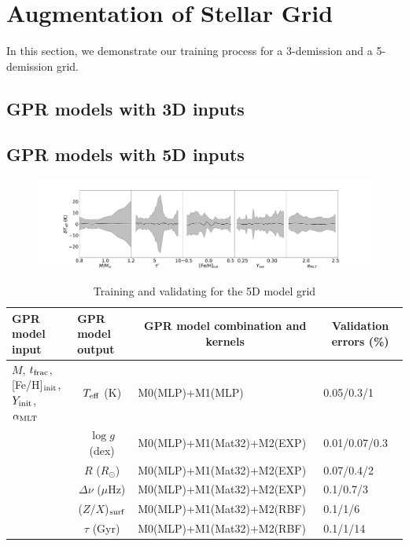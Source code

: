 \section{Augmentation of Stellar Grid}\label{sec:augmentation}
In this section, we demonstrate our training process for a 3-demission and a 5-demission grid.  

\subsection{GPR models with 3D inputs}

\subsection{GPR models with 5D inputs}

\begin{figure}
	\includegraphics[width=1.1\textwidth]{validataion_vs_inputs_teff.pdf}
    \caption{}
    \label{fig:5dresults}
\end{figure}


\begin{table}
	\centering
	\caption{Training and validating for the 5D model grid}
	\label{tab:gpdetails}
	\begin{tabular}{lcll} %
		\hline
		 GPR model input &\multicolumn{1}{l}{GPR model output} & \multicolumn{1}{c}{GPR model combination and kernels}& 
		  \multicolumn{1}{c}{Validation errors (\%)}\\ 
		 \hline
		 $M$, $t_{\rm frac}$, [Fe/H]$_{\rm init}$, $Y_{\rm init}$, $\alpha_{\rm MLT}$ & $T_{\rm eff}$ (K) &M0(MLP)+M1(MLP)& 0.05/0.3/1\\
		 &$\log g$ (dex)  & M0(MLP)+M1(Mat32)+M2(EXP) &0.01/0.07/0.3\\
		 &$R$ ($R_{\odot}$) & M0(MLP)+M1(Mat32)+M2(EXP) &0.07/0.4/2\\
		  &$\Delta\nu$ ($\mu$Hz) & M0(MLP)+M1(Mat32)+M2(EXP) &0.1/0.7/3\\
		  &($Z/X$)$_{\rm surf}$ & M0(MLP)+M1(Mat32)+M2(RBF) & 0.1/1/6\\
		  &$\tau$ (Gyr) & M0(MLP)+M1(Mat32)+M2(RBF) & 0.1/1/14\\
       \hline
	\end{tabular}
\end{table}



